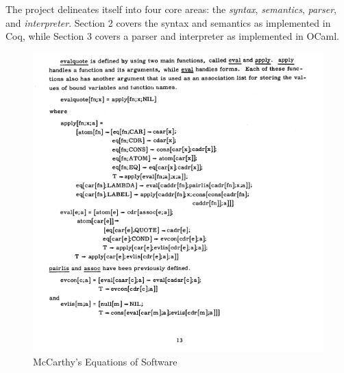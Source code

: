 \documentclass[10pt]{article}
\begin{document}
The project delineates itself into four core areas: the \emph{syntax},
\emph{semantics}, \emph{parser}, and \emph{interpreter}. Section 2
covers the syntax and semantics as implemented in Coq, while Section 3
covers a parser and interpreter as implemented in OCaml.

\begin{figure}[h]
\includegraphics{Lisp_Maxwells_Equations}
\caption{McCarthy's Equations of Software}
\end{figure}

\end{document}
